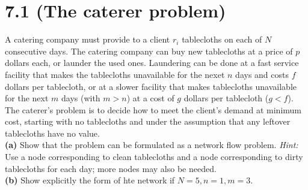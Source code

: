 \documentclass{article}
\begin{document}
\section*{7.1 (The caterer problem)}
A catering company must provide to a client $r_i$ tablecloths on each of $N$ consecutive days.  The catering company can buy new tablecloths at a price of $p$ dollars each, or launder the used ones.  Laundering can be done at a fast service facility that makes the tablecloths unavailable for the nexet $n$ days and costs $f$ dollars per tablecloth, or at a slower facility that makes tablecloths unavailable for the next $m$ days (with $m > n$) at a cost of $g$ dollars per tablecloth ($g < f$).  The caterer's problem is to decide how to meet the  client's demand at minimum cost, starting with no tablecloths and under the assumption that any leftover tablecloths have no value. \\

\noindent \textbf{(a)}
Show that the problem can be formulated as a network flow problem.  \emph{Hint:}  Use a node corresponding to clean tablecloths and a node corresponding to dirty tablecloths for each day; more nodes may also be needed. \\

\noindent \textbf{(b)}
Show explicitly the form of hte network if $N = 5, n=1, m=3$.  
\end{document}
